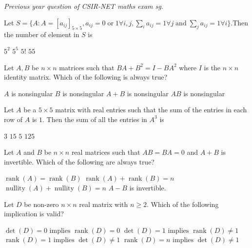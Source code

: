 \documentclass[10pt]{exam}
\DeclareMathOperator{\orr}{\text{ or }}
\DeclareMathOperator{\andd}{\text{ and }}
\DeclareMathOperator{\rank}{\text{rank}}
\DeclareMathOperator{\nullity}{\text{nullity}}
\begin{document}
 

\noindent \emph{Previous year question of CSIR-NET maths exam sg}. 
\begin{questions}

\question
Let
$S=\lbrace A:A=[a_{ij}]_{5\times 5},a_{ij}=0 \orr 1 \forall i, j ,\sum_i a_{ij}=1 \forall j \andd \sum_j a_{ij}=1 \forall i \rbrace$.Then the number of element in $S$ is

\begin{oneparchoices}
\choice $5^2$ 
\choice $5^5$  
\choice $5!$
\choice $55$
\end{oneparchoices}

\question
Let $A,B$ be $n \times n$  matrices such that $BA+B^2 = I - BA^2$ where $I$ is the $n\times n$ identity matrix. Which of the following is always true?

\begin{choices}
\choice $A$ is nonsingular
\choice $B$ is nonsingular 
\choice $A +B$ is nonsingular
\choice $AB$ is nonsingular 
\end{choices}


\question 
Let $A$ be a $5 \times 5$ matrix with real entries such that the sum of the entries in each row of $A$ is $1$. Then the sum of all the entries in $A^3$ is 

\begin{oneparchoices}
\choice $3$ 
\choice $15$ 
\choice $5$ 
\choice $125$ 
\end{oneparchoices}
\question
Let $A$ and $B$ be $n \times n$ real matrices such that $AB=BA=0$ and $A+B$ is invertible. Which of the following are always true?

\begin{checkboxes}
\choice $\rank(A)=\rank(B)$
\choice $\rank(A)+\rank(B)=n$
\choice $\nullity(A)+\nullity(B)=n$
\choice $A-B$ is invertible.
\end{checkboxes}


\question
Let $D$ be non-zero $n \times n$ real matrix with $n \geq 2$. Which of the following implication is valid? 

\begin{choices}
\choice $\det(D)=0 \text{ implies } \rank(D)=0$ 
\choice $\det(D)=1 \text{ implies } \rank(D)\neq 1$
\choice $\rank(D)=1 \text{ implies } \det(D)\neq 1$
\choice $\rank(D)=n \text{ implies } \det(D) \neq 1$
\end{choices}


\end{questions}
\end{document}
